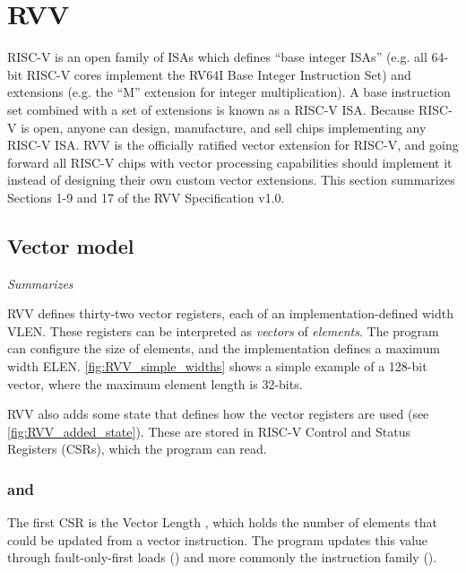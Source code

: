 \section{RVV}\label{chap:bg:sec:rvv}
RISC-V is an open family of ISAs which defines ``base integer ISAs'' (e.g. all 64-bit RISC-V cores implement the RV64I Base Integer Instruction Set) and extensions (e.g. the ``M'' extension for integer multiplication).
A base instruction set combined with a set of extensions is known as a RISC-V ISA.
Because RISC-V is open, anyone can design, manufacture, and sell chips implementing any RISC-V ISA.
RVV is the officially ratified vector extension for RISC-V, and going forward all RISC-V chips with vector processing capabilities should implement it instead of designing their own custom vector extensions.
This section summarizes Sections 1-9 and 17 of the RVV Specification v1.0\cite{RISCVVectorExtension2021}.

\subsection{Vector model}\label{chap:bg:sec:rvv:vector_model}
\emph{Summarizes \cite[Sections 1-4]{RISCVVectorExtension2021}}




RVV defines thirty-two vector registers, each of an implementation-defined width VLEN.
These registers can be interpreted as \emph{vectors} of \emph{elements}.
The program can configure the size of elements, and the implementation defines a maximum width ELEN.
\cref{fig:RVV_simple_widths} shows a simple example of a 128-bit vector, where the maximum element length is 32-bits.


RVV also adds some state that defines how the vector registers are used (see \cref{fig:RVV_added_state}).
These are stored in RISC-V Control and Status Registers (CSRs), which the program can read.

\subsubsection{ and }\label{chap:bg:sec:rvv:vstart}
The first CSR is the Vector Length , which holds the number of elements that could be updated from a vector instruction.
The program updates this value through fault-only-first loads () and more commonly the  instruction family ().


